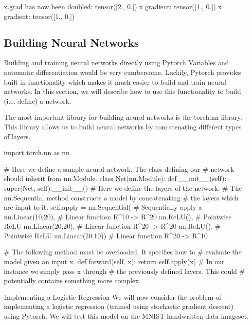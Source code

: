 \begin{python}
x.grad has now been doubled: tensor([2., 0.])
x gradient: tensor([1., 0.])
x gradient: tensor([1., 0.])
\end{python}

\subsection{Building Neural Networks} %
Building and training neural networks directly using Pytorch Variables and automatic differentiation would be very cumbersome. Luckily, Pytorch provides built-in functionality which makes it much easier to build and train neural networks. In this section, we will describe how to use this functionality to build (i.e. define) a network.

The most important library for building neural networks is the torch.nn library. This library allows us to build neural networks by concatenating different types of layers.
\begin{python}
import torch.nn as nn

# Here we define a sample neural network. The class defining our
# network should inherit from nn.Module.
class Net(nn.Module):
  def __init__(self):
    super(Net, self).__init__()
    # Here we define the layers of the network.
    # The nn.Sequential method constructs a model by concatenating
    # the layers which are input to it.
    self.apply = nn.Sequential( # Sequentially apply a
        nn.Linear(10,20),       # Linear function R^10 -> R^20
        nn.ReLU(),              # Pointwise ReLU
        nn.Linear(20,20),       # Linear function R^20 -> R^20
        nn.ReLU(),              # Pointwise ReLU
        nn.Linear(20,10))       # Linear function R^20 -> R^10

  # The following method must be overloaded. It specifies how to
  # evaluate the model given an input x.
  def forward(self, x):
    return self.apply(x) # In our instance we simply pass x through
                         # the previously defined layers. This could
                         # potentially contains something more complex.
\end{python}
Implementing a Logistic Regression
We will now consider the problem of implementing a logistic regression (trained using stochastic gradient descent) using Pytorch. We will test this model on the MNIST handwritten data imageset.

